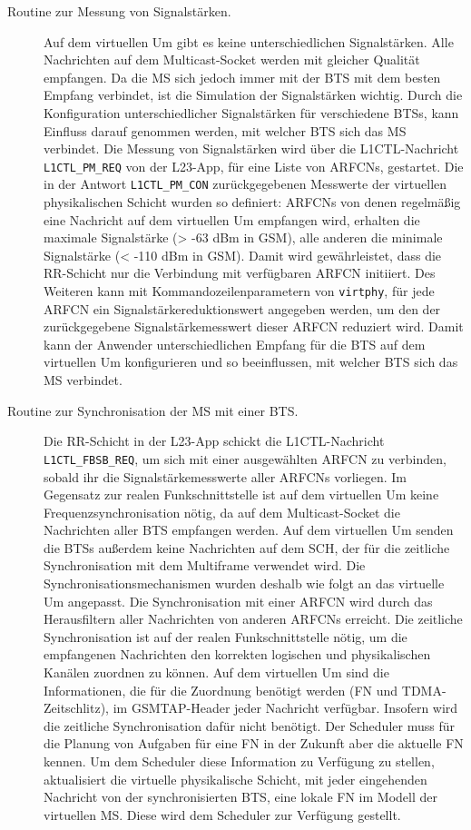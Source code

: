 \begin{description}
\item[Routine zur Messung von Signalstärken.] Auf dem virtuellen \ac{Um} gibt es keine unterschiedlichen Signalstärken. Alle Nachrichten auf dem Multicast-Socket werden mit gleicher Qualität empfangen. Da die \ac{MS} sich jedoch immer mit der \ac{BTS} mit dem besten Empfang verbindet, ist die Simulation der Signalstärken wichtig. Durch die Konfiguration unterschiedlicher Signalstärken für verschiedene \acp{BTS}, kann Einfluss darauf genommen werden, mit welcher \ac{BTS} sich das \ac{MS} verbindet. Die Messung von Signalstärken wird über die \ac{L1CTL}-Nachricht \texttt{L1CTL\_PM\_REQ} von der L23-App, für eine Liste von \acp{ARFCN}, gestartet. Die in der Antwort \texttt{L1CTL\_PM\_CON} zurückgegebenen Messwerte der virtuellen physikalischen Schicht wurden so definiert: \acp{ARFCN} von denen regelmäßig eine Nachricht auf dem virtuellen \ac{Um} empfangen wird, erhalten die maximale Signalstärke (> -63 dBm in \ac{GSM}), alle anderen die minimale Signalstärke (< -110 dBm in \ac{GSM}). Damit wird gewährleistet, dass die \ac{RR}-Schicht nur die Verbindung mit verfügbaren \ac{ARFCN} initiiert. Des Weiteren kann mit Kommandozeilenparametern von \texttt{virtphy}, für jede \ac{ARFCN} ein Signalstärkereduktionswert angegeben werden, um den der zurückgegebene Signalstärkemesswert dieser \ac{ARFCN} reduziert wird. Damit kann der Anwender unterschiedlichen Empfang für die \ac{BTS} auf dem virtuellen \ac{Um} konfigurieren und so beeinflussen, mit welcher \ac{BTS} sich das \ac{MS} verbindet.
\item[Routine zur Synchronisation der \ac{MS} mit einer \ac{BTS}.] Die \ac{RR}-Schicht in der L23-App schickt die \ac{L1CTL}-Nachricht \texttt{L1CTL\_FBSB\_REQ}, um sich mit einer ausgewählten \ac{ARFCN} zu verbinden, sobald ihr die Signalstärkemesswerte aller \acp{ARFCN} vorliegen. Im Gegensatz zur realen Funkschnittstelle ist auf dem virtuellen \ac{Um} keine Frequenzsynchronisation nötig, da auf dem Multicast-Socket die Nachrichten aller \ac{BTS} empfangen werden. Auf dem virtuellen \ac{Um} senden die \acp{BTS} außerdem keine Nachrichten auf dem \ac{SCH}, der für die zeitliche Synchronisation mit dem Multiframe verwendet wird. Die Synchronisationsmechanismen wurden deshalb wie folgt an das virtuelle \ac{Um} angepasst. Die Synchronisation mit einer \ac{ARFCN} wird durch das Herausfiltern aller Nachrichten von anderen \acp{ARFCN} erreicht. Die zeitliche Synchronisation ist auf der realen Funkschnittstelle nötig, um die empfangenen Nachrichten den korrekten logischen und physikalischen Kanälen zuordnen zu können. Auf dem virtuellen \ac{Um} sind die Informationen, die für die Zuordnung benötigt werden (\ac{FN} und \ac{TDMA}-Zeitschlitz), im \ac{GSMTAP}-Header jeder Nachricht verfügbar. Insofern wird die zeitliche Synchronisation dafür nicht benötigt. Der Scheduler muss für die Planung von Aufgaben für eine \ac{FN} in der Zukunft aber die aktuelle \ac{FN} kennen. Um dem Scheduler diese Information zu Verfügung zu stellen, aktualisiert die virtuelle physikalische Schicht, mit jeder eingehenden Nachricht von der synchronisierten \ac{BTS}, eine lokale \ac{FN} im Modell der virtuellen \ac{MS}. Diese wird dem Scheduler zur Verfügung gestellt.

\end{description}
